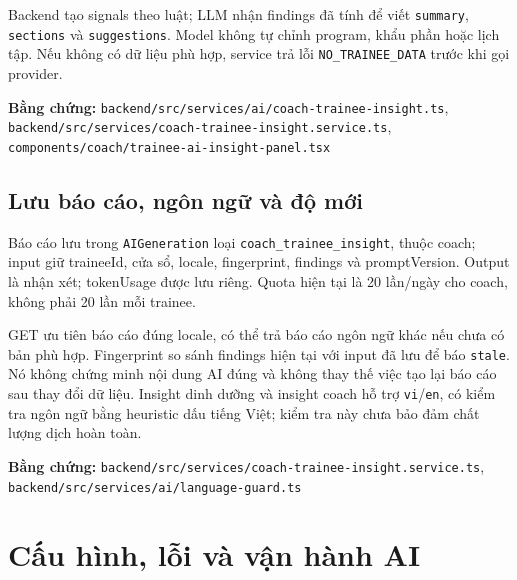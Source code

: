 \documentclass[12pt,a4paper]{article}
\newcommand{\code}[1]{\texttt{#1}}
\newcommand{\evidence}[1]{{\small\nolinkurl{#1}}}
\begin{document}
Backend tạo signals theo luật; LLM nhận findings đã tính để viết \code{summary}, \code{sections} và \code{suggestions}. Model không tự chỉnh program, khẩu phần hoặc lịch tập. Nếu không có dữ liệu phù hợp, service trả lỗi \code{NO\_TRAINEE\_DATA} trước khi gọi provider.

\textbf{Bằng chứng:} \evidence{backend/src/services/ai/coach-trainee-insight.ts}, \evidence{backend/src/services/coach-trainee-insight.service.ts}, \evidence{components/coach/trainee-ai-insight-panel.tsx}

\subsection{Lưu báo cáo, ngôn ngữ và độ mới}
Báo cáo lưu trong \code{AIGeneration} loại \code{coach\_trainee\_insight}, thuộc coach; input giữ traineeId, cửa sổ, locale, fingerprint, findings và promptVersion. Output là nhận xét; tokenUsage được lưu riêng. Quota hiện tại là 20 lần/ngày cho coach, không phải 20 lần mỗi trainee.

GET ưu tiên báo cáo đúng locale, có thể trả báo cáo ngôn ngữ khác nếu chưa có bản phù hợp. Fingerprint so sánh findings hiện tại với input đã lưu để báo \code{stale}. Nó không chứng minh nội dung AI đúng và không thay thế việc tạo lại báo cáo sau thay đổi dữ liệu. Insight dinh dưỡng và insight coach hỗ trợ \code{vi}/\code{en}, có kiểm tra ngôn ngữ bằng heuristic dấu tiếng Việt; kiểm tra này chưa bảo đảm chất lượng dịch hoàn toàn.

\textbf{Bằng chứng:} \evidence{backend/src/services/coach-trainee-insight.service.ts}, \evidence{backend/src/services/ai/language-guard.ts}

\section{Cấu hình, lỗi và vận hành AI}
\end{document}

